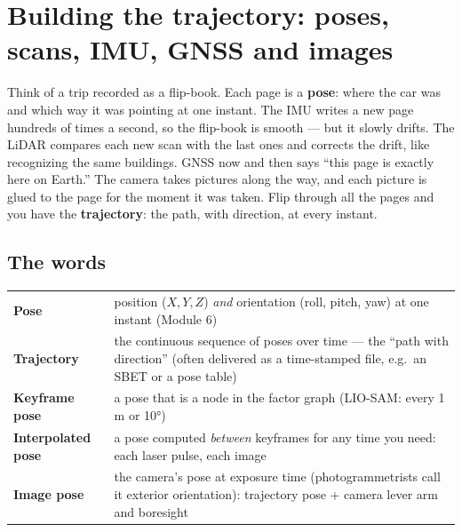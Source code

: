 \section{Building the trajectory: poses, scans, IMU, GNSS and images}
\begin{kid}
Think of a trip recorded as a flip-book. Each page is a \textbf{pose}: where the car was and which way it was pointing at one instant. The IMU writes a new page hundreds of times a second, so the flip-book is smooth --- but it slowly drifts. The LiDAR compares each new scan with the last ones and corrects the drift, like recognizing the same buildings. GNSS now and then says ``this page is exactly here on Earth.'' The camera takes pictures along the way, and each picture is glued to the page for the moment it was taken. Flip through all the pages and you have the \textbf{trajectory}: the path, with direction, at every instant.
\end{kid}

\subsection*{The words}
\begin{center}\small
\renewcommand{\arraystretch}{1.2}
\begin{tabularx}{\linewidth}{>{\bfseries}p{3.0cm}X}\toprule
Pose & position ($X,Y,Z$) \emph{and} orientation (roll, pitch, yaw) at one instant (Module 6)\\
Trajectory & the continuous sequence of poses over time --- the ``path with direction'' (often delivered as a time-stamped file, e.g.\ an SBET or a pose table)\\
Keyframe pose & a pose that is a node in the factor graph (LIO-SAM: every 1 m or 10°)\\
Interpolated pose & a pose computed \emph{between} keyframes for any time you need: each laser pulse, each image\\
Image pose & the camera's pose at exposure time (photogrammetrists call it exterior orientation): trajectory pose + camera lever arm and boresight\\\bottomrule
\end{tabularx}\end{center}


